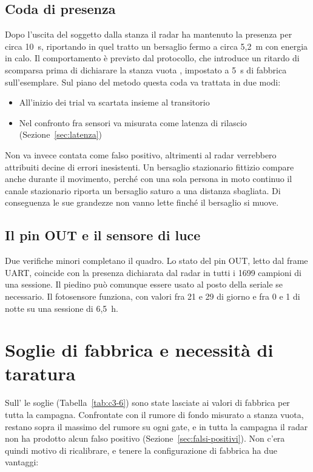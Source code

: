 \subsection{Coda di presenza}
\label{sec:c3-5-3}

Dopo l'uscita del soggetto dalla stanza il radar ha mantenuto la presenza per circa 10~s, riportando in quel tratto un bersaglio fermo a circa 5,2~m con energia in calo. Il comportamento è previsto dal protocollo, che introduce un ritardo di scomparsa prima di dichiarare la stanza vuota \cite[§1.2.2]{hilinkProtoV107}, impostato a 5~s di fabbrica sull'esemplare. Sul piano del metodo questa coda va trattata in due modi:

\begin{itemize}
  \item All'inizio dei trial va scartata insieme al transitorio
  \item Nel confronto fra sensori va misurata come latenza di rilascio (Sezione~\ref{sec:latenza})
\end{itemize}

Non va invece contata come falso positivo, altrimenti al radar verrebbero attribuiti decine di errori inesistenti. Un bersaglio stazionario fittizio compare anche durante il movimento, perché con una sola persona in moto continuo il canale stazionario riporta un bersaglio saturo a una distanza sbagliata. Di conseguenza le sue grandezze non vanno lette finché il bersaglio si muove.

\subsection{Il pin OUT e il sensore di luce}
\label{sec:c3-5-4}

Due verifiche minori completano il quadro. Lo stato del pin OUT, letto dal frame UART, coincide con la presenza dichiarata dal radar in tutti i 1699 campioni di una sessione. Il piedino può comunque essere usato al posto della seriale se necessario. Il fotosensore funziona, con valori fra 21 e 29 di giorno e fra 0 e 1 di notte su una sessione di 6,5~h.

\FloatBarrier
\section{Soglie di fabbrica e necessità di taratura}
\label{sec:c3-6}

Sull'\ldb{} le soglie (Tabella~\ref{tab:c3-6}) sono state lasciate ai valori di fabbrica per tutta la campagna. Confrontate con il rumore di fondo misurato a stanza vuota, restano sopra il massimo del rumore su ogni gate, e in tutta la campagna il radar non ha prodotto alcun falso positivo (Sezione~\ref{sec:falsi-positivi}). Non c'era quindi motivo di ricalibrare, e tenere la configurazione di fabbrica ha due vantaggi:


